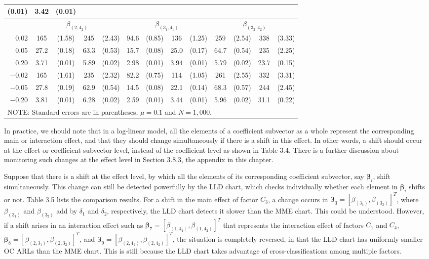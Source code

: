 \begin{table}[ht]
\begin{tabular}{r|cccc|cccc|cccc}
(0.01) & 3.42 & (0.01)
\\\hline
& \multicolumn{4}{c|}{$\beta_{(2,4_2)}$} & \multicolumn{4}{c|}{$\beta_{(3_1,4_1)}$}
& \multicolumn{4}{c}{$\beta_{(3_2,4_2)}$}
\\\hline
0.02 & 165 & (1.58) & 245 & (2.43) & 94.6 & (0.85) & 136 & (1.25) & 259 & (2.54) &
338 & (3.33)
\\
0.05 & 27.2 & (0.18) & 63.3 & (0.53) & 15.7 & (0.08) & 25.0 & (0.17) & 64.7 & (0.54)
& 235 & (2.25)
\\
0.20 & 3.71 & (0.01) & 5.89 & (0.02) & 2.98 & (0.01) & 3.94 & (0.01) & 5.79 & (0.02)
& 23.7 & (0.15)
\\
$-0.02$ & 165 & (1.61) & 235 & (2.32) & 82.2 & (0.75) & 114 & (1.05) & 261 & (2.55)
& 332 & (3.31)
\\
$-0.05$ & 27.8 & (0.19) & 62.9 & (0.54) & 14.5 & (0.08) & 22.1 & (0.14) & 68.3 &
(0.57) & 244 & (2.45)
\\
$-0.20$ & 3.81 & (0.01) & 6.28 & (0.02) & 2.59 & (0.01) & 3.44 & (0.01) & 5.96 &
(0.02) & 31.1 & (0.22)
\\\hline
\multicolumn{13}{l}{NOTE: Standard errors are in parentheses, $\mu=0.1$ and
$N=1,000$.}
\end{tabular}\vspace{-0.3cm}
\end{table}

In practice, we should note that in a log-linear model, all the elements of a
coefficient subvector as a whole represent the corresponding main or interaction
effect, and that they should change simultaneously if there is a shift in this
effect. In other words, a shift should occur at the effect or coefficient subvector
level, instead of the coefficient level as shown in Table 3.4. There is a further
discussion about monitoring such changes at the effect level in Section 3.8.3, the
appendix in this chapter.

Suppose that there is a shift at the effect level, by which all the elements of its
corresponding coefficient subvector, say $\bm\beta_i$, shift simultaneously. This
change can still be detected powerfully by the LLD chart, which checks individually
whether each element in $\bm\beta_i$ shifts or not. Table 3.5 lists the comparison
results. For a shift in the main effect of factor $C_3$, a change occurs in
$\bm\beta_3=[\beta_{(3_1)},\beta_{(3_2)}]^T$, where $\beta_{(3_1)}$ and
$\beta_{(3_2)}$ add by $\delta_1$ and $\delta_2$, respectively, the LLD chart
detects it slower than the MME chart. This could be understood. However, if a shift
arises in an interaction effect such as
$\bm\beta_7=[\beta_{(1,4_1)},\beta_{(1,4_2)}]^T$ that represents the interaction
effect of factors $C_1$ and $C_4$, $\bm\beta_8=[\beta_{(2,3_1)},\beta_{(2,3_2)}]^T$,
and $\bm\beta_9=[\beta_{(2,4_1)},\beta_{(2,4_2)}]^T$, the situation is completely
reversed, in that the LLD chart has uniformly smaller OC ARLs than the MME chart.
This is still because the LLD chart takes advantage of cross-classifications among
multiple factors.

